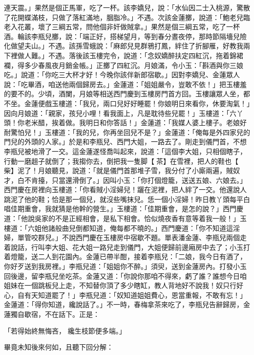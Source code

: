 連天震。」果然是個正馬軍，吃了一杯。該李嬌兒，說：「水仙因二士入桃源，驚散了花開蝶滿枝，只做了落紅滿地，胭脂冷。」不遇。次該金蓮擲，說道：「鮑老兒臨老入花叢，壞了三綱五常，問他個非奸做賊拿。」果然是個三綱五常，吃了一杯酒。輪該李瓶兒擲，說：「端正好，搭梯望月，等到春分晝夜停，那時節隔墻兒險化做望夫山。」不遇。該孫雪蛾說：「麻郎兒見群鴉打鳳，絆住了折腳雁，好教我兩下裡做人難。」不遇。落後該玉樓完令，說道：「念奴嬌醉扶定四紅沉，拖着錦裙襴，得多少春風夜月銷金帳。」正擲了四紅沉。月娘滿，令小玉：「斟酒與你三娘吃。」說道：「你吃三大杯才好！今晚你該伴新郎宿歇。」因對李嬌兒、金蓮眾人說：「吃畢酒，咱送他兩個歸房去。」金蓮道：「姐姐嚴令，豈敢不依！」把玉樓羞的要不的。少頃，酒闌，月娘等相送西門慶到玉樓房門首方回。玉樓讓眾人坐，都不坐。金蓮便戲玉樓道：「我兒，兩口兒好好睡罷！你娘明日來看你，休要淘氣！」因向月娘道：「親家，孩兒小哩！看我面上，凡是耽待些兒罷！」玉樓道：「六丫頭！你老米醋，挨着做。我明日和你答話！」金蓮道：「我媒人婆上樓子。老娘好耐驚怕兒！」玉樓道：「我的兒，你再坐回兒不是？」金蓮道：「俺每是外四家兒的門兒的外頭的人家。」於是和李瓶兒、西門大姐，一路去了。剛走到儀門首，不想李瓶兒被地滑了一交。這金蓮遂怪喬叫起來，說道：「這個李大姐，只相個瞎子，行動一磨趄子就倒了；我搊你去，倒把我一隻脚【茶】在雪裡，把人的鞋也【柴】泥了！月娘聽見，說道：「就是儀門首那堆子雪，我分付了小廝兩遍，賊奴才，白不肯擡，只當還滑倒了。」因叫小玉：「你打個燈籠，送送五娘、六娘去。」西門慶在房裡向玉樓道：「你看賊小淫婦兒！躧在泥裡，把人絆了一交。他還說人跳泥了他的鞋；恰是那一個兒，就沒些嘴抹兒。恁一個小淫婦！昨日教丫頭每平白唱佳期重會，我就猜是他幹的營生。」玉樓道：「佳期重會，是怎的說？」西門慶道：「他說吳家的不是正經相會，是私下相會。恰似燒夜香有意等着我一般！」玉樓道：「六姐他諸般曲兒倒都知道，俺每都不曉的。」西門慶道：「你不知道這淫婦，單管咬群兒。」不說西門慶在玉樓房中宿歇不題。單表潘金蓮、李瓶兒兩個走着說話，行叫李大姐、花大姐一路兒走到儀門，大姐便歸前邊廂房中去了；小玉打着燈籠，送二人到花園內。金蓮已帶半酣，接着李瓶兒：「二娘，我今日有酒了，你好歹送到我房裡。」李瓶兒道：「姐姐你不醉。」須臾，送到金蓮房內。打發小玉回後邊，留李瓶兒坐吃茶。金蓮又道：「你說你那咱不得來，虧了誰？誰想今日咱姐妹在一個跳板兒上走，不知替你頂了多少瞎缸，教人背地好不說我！奴只行好心，自有天知道罷了！」李瓶兒道：「奴知道姐姐費心，恩當重報，不敢有忘！」金蓮道：「得你知道，纔說話了。」不一時，春梅拿茶來吃了，李瓶兒告辭歸房，金蓮獨自歇宿，不在話下。正是：

「若得始終無悔吝， 纔生枝節便多端。」

畢竟未知後來何如，且聽下回分解：

